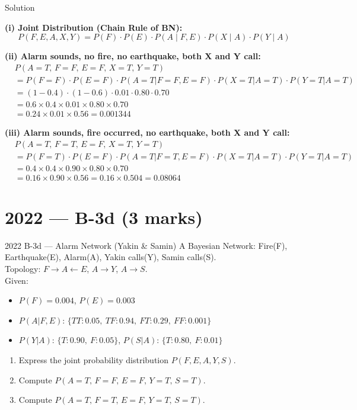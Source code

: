\documentclass[12pt,a4paper]{article}
\begin{document}
\begin{solbox}{Solution}

\textbf{(i) Joint Distribution (Chain Rule of BN):}
\[
P(F,E,A,X,Y) = P(F)\cdot P(E)\cdot P(A \mid F,E)\cdot P(X \mid A)\cdot P(Y \mid A)
\]

\textbf{(ii) Alarm sounds, no fire, no earthquake, both X and Y call:}
\begin{align*}
&P(A{=}T,\,F{=}F,\,E{=}F,\,X{=}T,\,Y{=}T)\\
&= P(F{=}F)\cdot P(E{=}F)\cdot P(A{=}T|F{=}F,E{=}F)\cdot P(X{=}T|A{=}T)\cdot P(Y{=}T|A{=}T)\\
&= (1-0.4)\cdot(1-0.6)\cdot 0.01 \cdot 0.80 \cdot 0.70\\
&= 0.6 \times 0.4 \times 0.01 \times 0.80 \times 0.70\\
&= 0.24 \times 0.01 \times 0.56 = \boxed{0.001344}
\end{align*}

\textbf{(iii) Alarm sounds, fire occurred, no earthquake, both X and Y call:}
\begin{align*}
&P(A{=}T,\,F{=}T,\,E{=}F,\,X{=}T,\,Y{=}T)\\
&= P(F{=}T)\cdot P(E{=}F)\cdot P(A{=}T|F{=}T,E{=}F)\cdot P(X{=}T|A{=}T)\cdot P(Y{=}T|A{=}T)\\
&= 0.4 \times 0.4 \times 0.90 \times 0.80 \times 0.70\\
&= 0.16 \times 0.90 \times 0.56 = 0.16 \times 0.504 = \boxed{0.08064}
\end{align*}
\end{solbox}

\newpage
\section{2022 --- B-3d (3 marks)}

\begin{qbox}{2022 B-3d --- Alarm Network (Yakin \& Samin)}
A Bayesian Network: Fire(F), Earthquake(E), Alarm(A), Yakin calls(Y), Samin calls(S).\\
Topology: $F \to A \leftarrow E$, $A \to Y$, $A \to S$.\\[4pt]
Given:
\begin{itemize}[noitemsep]
  \item $P(F)=0.004$, \quad $P(E)=0.003$
  \item $P(A|F,E)$: $\{TT: 0.05,\ TF: 0.94,\ FT: 0.29,\ FF: 0.001\}$
  \item $P(Y|A)$: $\{T: 0.90,\ F: 0.05\}$, \quad $P(S|A)$: $\{T: 0.80,\ F: 0.01\}$
\end{itemize}
\begin{enumerate}[label=(\roman*)]
  \item Express the joint probability distribution $P(F,E,A,Y,S)$.
  \item Compute $P(A=T,\, F=F,\, E=F,\, Y=T,\, S=T)$.
  \item Compute $P(A=T,\, F=T,\, E=F,\, Y=T,\, S=T)$.
\end{enumerate}
\end{qbox}
\end{document}

